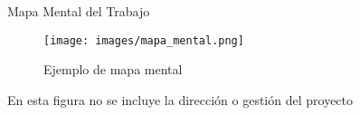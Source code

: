 \documentclass[class=article, crop=false]{standalone}
\begin{document}
Mapa Mental del Trabajo




\begin{figure}
    \centering
    \texttt{[image: images/mapa\_mental.png]}
    \caption{Ejemplo de mapa mental}
    \label{fig:enter-label}
\end{figure}




\caption{Etapas del proyecto de un proyecto}




En esta figura no se incluye la dirección o gestión del proyecto

\blindtext


\blindtext


\blindtext
\end{document}
